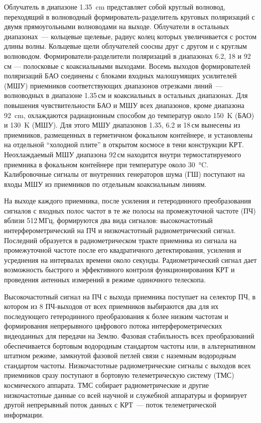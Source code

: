 Облучатель в диапазоне \SI{1.35}{\cm} представляет
собой круглый волновод, переходящий в волноводный формирователь-разделитель круговых поляризаций с
двумя прямоугольными волноводами
на выходе. Облучатели в остальных диапазонах~---
кольцевые щелевые, радиус колец которых увеличивается с ростом длины волны. Кольцевые щели
облучателей соосны друг с другом и с круглым
волноводом. Формирователи-разделители поляризаций в диапазонах 6.2, 18 и 92\,см --- полосковые
с коаксиальными выходами. Восемь выходов формирователей поляризаций БАО соединены с блоками входных
малошумящих усилителей (МШУ)
приемников соответствующих диапазонов отрезками линий~--- волноводных в диапазоне
1.35\,см и коаксиальных в остальных диапазонах. Для повышения чувствительности БАО и МШУ всех
диапазонов, кроме диапазона \SI{92}{\cm}, охлаждаются радиационным способом до температур около
\SI{150}{\kelvin}
(БАО) и \SI{130}{\kelvin} (МШУ). Для этого МШУ диапазонов 1.35, 6.2 и 18\,см вынесены из приемников,
размещенных в герметичном фокальном контейнере, и установлены на отдельной ``холодной плите'' в
открытом космосе в тени конструкции КРТ. Неохлаждаемый МШУ диапазона 92\,см находится
внутри термостатируемого приемника в фокальном
контейнере при температуре около \SI{30}{\degreeCelsius}. Калибровочные сигналы от внутренних
генераторов
шума (ГШ) поступают на входы МШУ из приемников по
отдельным коаксиальным линиям.

На выходе каждого приемника, после усиления
и гетеродинного преобразования сигналов с входных полос частот в те же полосы на промежуточной
частоте (ПЧ) вблизи 512\,МГц, формируются два
вида сигналов: высокочастотный интерферометрический на ПЧ и низкочастотный радиометрический
сигнал. Последний образуется в радиометрическом тракте приемника из сигнала на промежуточной частоте
после его квадратичного детектирования, усиления и усреднения на интервалах времени около секунды.
Радиометрический сигнал дает
возможность быстрого и эффективного контроля
функционирования КРТ и проведения антенных
измерений в режиме одиночного телескопа.

Высокочастотный сигнал на ПЧ с выхода приемника поступает на селектор ПЧ, в котором из
8 ПЧ-выходов от всех приемников выбираются
два для их последующего гетеродинного преобразования к более низким частотам и формирования
непрерывного цифрового потока интерферометрических видеоданных для передачи на Землю. Фазовая
стабильность всех преобразований обеспечивается бортовым водородным стандартом частоты
или, в альтернативном штатном режиме, замкнутой фазовой петлей связи с наземным водородным
стандартом частоты. Низкочастотные радиометрические сигналы с выходов всех приемников сразу
поступают в бортовую телеметрическую систему
(ТМС) космического аппарата. ТМС собирает радиометрические и другие низкочастотные данные
со всей научной и служебной аппаратуры и формирует другой непрерывный поток данных с КРТ~--- поток
телеметрической информации.

